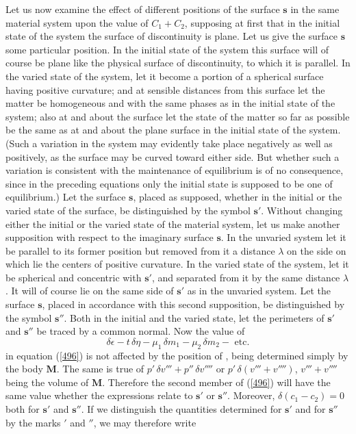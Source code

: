 \documentclass[12pt]{article}
\newcommand{\dd}{\delta}
\begin{document}
{Let us now examine the effect of different positions of the surface $\mathbf{s}$ in the same material system upon the value of $C_1 +C_2$, supposing at first that in the initial state of the system the surface of discontinuity is plane. Let us give the surface $\mathbf{s}$ some particular position. In the initial state of the system this surface will of course be plane like the physical surface of discontinuity, to which it is parallel. In the varied state of the system, let it become a portion of a spherical surface having positive curvature; and at sensible distances from this surface let the matter be homogeneous and with the same phases as in the initial state of the system; also at and about the surface let the state of the matter so far as possible be the same as at and about the plane surface in the initial state of the system. (Such a variation in the system may evidently take place negatively as well as positively, as the surface may be curved toward either side. But whether such a variation is consistent with the maintenance of equilibrium is of no consequence, since in the preceding equations only the initial state is supposed to be one of equilibrium.) Let the surface $\mathbf{s}$, placed as supposed, whether in the initial or the varied state of the surface, be distinguished by the symbol $\mathbf{s}'$. Without changing either the initial or the varied state of the material system, let us make another supposition with respect to the imaginary surface $\mathbf{s}$. In the unvaried system let it be parallel to its former position but removed from it a distance $\lambda$ on the side on which lie the centers of positive curvature. In the varied state of the system, let it be spherical and concentric with $\mathbf{s}'$, and separated from it by the same distance $\lambda$. It will of course lie on the same side of $\mathbf{s}'$ as in the unvaried system. Let the surface $\mathbf{s}$, placed in accordance with this second supposition, be distinguished by the symbol $\mathbf{s}''$. Both in the initial and the varied state, let the perimeters of $\mathbf{s}'$ and $\mathbf{s}''$ be traced by a common normal. Now the value of
$$ \dd \epsilon - t \, \dd \eta- \mu_1 \, \dd m_1 - \mu_2 \, \dd m_2 - \text{ etc.} $$
in equation (\ref{496}) is not affected by the position of , being determined simply by the body $\mathbf{M}$. The same is true of $p'\, \dd v'''+p''\, \dd v''''$ or $p'\, \dd (v''' +v'''')$, $v'''+ v''''$ being the volume of $\mathbf{M}$. Therefore the second member of (\ref{496}) will have the same value whether the expressions relate to $\mathbf{s}'$ or $\mathbf{s}''$.  Moreover, $\dd(c_1 -c_2)=0$ both for $\mathbf{s}'$ and $\mathbf{s}''$. If we distinguish the quantities determined for $\mathbf{s}'$ and for $\mathbf{s}''$ by the marks $'$ and $''$, we may therefore write
}
\end{document}
